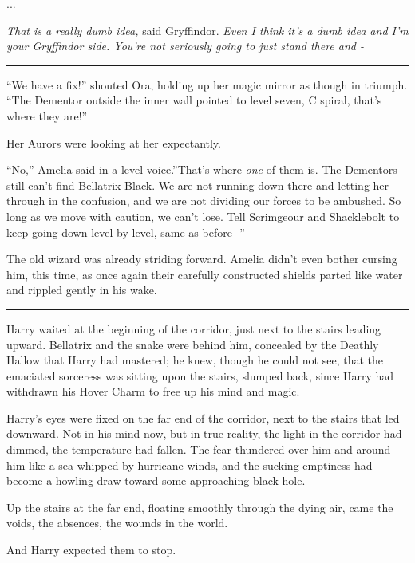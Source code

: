 ...

\emph{That is a really dumb idea,} said Gryffindor. \emph{Even I think
it's a dumb idea and I'm your Gryffindor side. You're not seriously
going to just stand there and -}

\begin{center}\rule{3in}{0.4pt}\end{center}

``We have a fix!'' shouted Ora, holding up her magic mirror as though in
triumph. ``The Dementor outside the inner wall pointed to level seven, C
spiral, that's where they are!''

Her Aurors were looking at her expectantly.

``No,'' Amelia said in a level voice.''That's where \emph{one} of them
is. The Dementors still can't find Bellatrix Black. We are not running
down there and letting her through in the confusion, and we are not
dividing our forces to be ambushed. So long as we move with caution, we
can't lose. Tell Scrimgeour and Shacklebolt to keep going down level by
level, same as before -''

The old wizard was already striding forward. Amelia didn't even bother
cursing him, this time, as once again their carefully constructed
shields parted like water and rippled gently in his wake.

\begin{center}\rule{3in}{0.4pt}\end{center}

Harry waited at the beginning of the corridor, just next to the stairs
leading upward. Bellatrix and the snake were behind him, concealed by
the Deathly Hallow that Harry had mastered; he knew, though he could not
see, that the emaciated sorceress was sitting upon the stairs, slumped
back, since Harry had withdrawn his Hover Charm to free up his mind and
magic.

Harry's eyes were fixed on the far end of the corridor, next to the
stairs that led downward. Not in his mind now, but in true reality, the
light in the corridor had dimmed, the temperature had fallen. The fear
thundered over him and around him like a sea whipped by hurricane winds,
and the sucking emptiness had become a howling draw toward some
approaching black hole.

Up the stairs at the far end, floating smoothly through the dying air,
came the voids, the absences, the wounds in the world.

And Harry expected them to stop.

